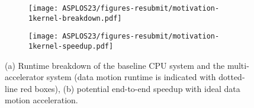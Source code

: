%
\begin{figure}
    \centering
    \begin{subfigure}[b]{\columnwidth}
    \texttt{[image: ASPLOS23/figures-resubmit/motivation-1kernel-breakdown.pdf]}
    \end{subfigure}
    \hspace{0.5in}
    \begin{subfigure}[b]{\columnwidth}
    \texttt{[image: ASPLOS23/figures-resubmit/motivation-1kernel-speedup.pdf]}
    \end{subfigure}
    \caption{(a) Runtime breakdown of the baseline CPU system and the multi-accelerator system (data motion runtime is indicated with dotted-line red boxes), (b) potential end-to-end speedup with ideal data motion acceleration.}
    \label{fig:motiv-breakdown}
    \vspace{-2ex}
\end{figure}